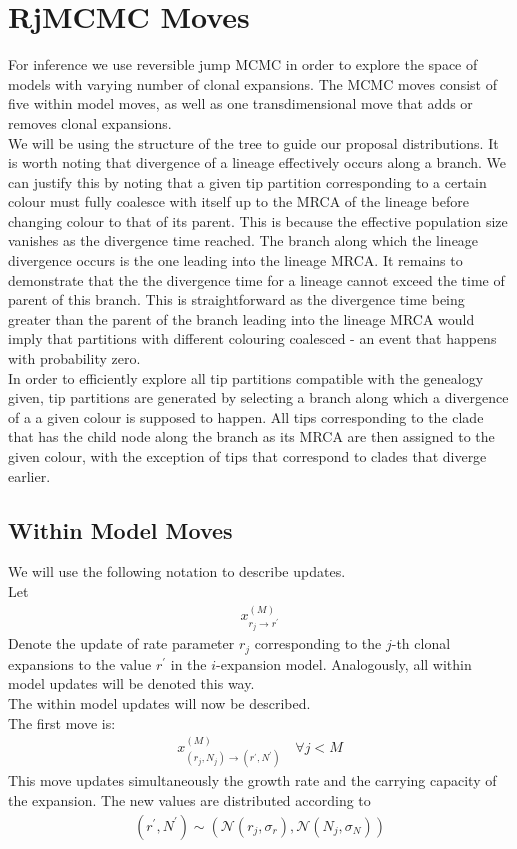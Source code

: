 \documentclass{report}
\theoremstyle{definition}
\begin{document}
\section{RjMCMC Moves}
For inference we use reversible jump MCMC in order to explore the space of models with varying number of clonal expansions.
The MCMC moves consist of five within model moves, as well as one transdimensional move that adds or removes clonal expansions.\\
We will be using the structure of the tree to guide our proposal distributions. It is worth noting that divergence of a lineage effectively occurs along a branch. We can justify this by noting that a given tip partition corresponding to a certain colour must fully coalesce with itself up to the MRCA of the lineage before changing colour to that of its parent. This is because the effective population size vanishes as the divergence time reached.
The branch along which the lineage divergence occurs is the one leading into the lineage MRCA. It remains to demonstrate that the the divergence time for a lineage cannot exceed the time of parent of this branch. This is straightforward as the divergence time being greater than the parent of the branch leading into the lineage MRCA would imply that partitions with different colouring coalesced - an event that happens with probability zero.\\
In order to efficiently explore all tip partitions compatible with the genealogy given, tip partitions are generated by selecting a branch along which a divergence of a a given colour is supposed to happen. All tips corresponding to the clade that has the child node along the branch as its MRCA are then assigned to the given colour, with the exception of tips that correspond to clades that diverge earlier. 
\subsection{Within Model Moves}
We will use the following notation to describe updates.\\ Let 
\begin{gather}
x^{(M)}_{r_j\to r^{'}}
\end{gather}
Denote the update of rate parameter $r_j$ corresponding to the $j$-th clonal expansions to the value $r^{'}$ in the $i$-expansion model. Analogously, all within model updates will be denoted this way.\\

The within model updates will now be described.\\
The first move is:
\begin{gather}
x^{(M)}_{\left(r_j,N_j\right)\to \left(r^{'},N^{'}\right)}\quad\forall j < M
\end{gather}
This move updates simultaneously the growth rate and the carrying capacity of the expansion. The new values are distributed according to
\begin{gather}
\left(r^{'},N^{'}\right)\sim\left(\mathcal{N}(r_j, \sigma_r), \mathcal{N}(N_j, \sigma_N)\right) 
\end{gather}\\
\end{document}
